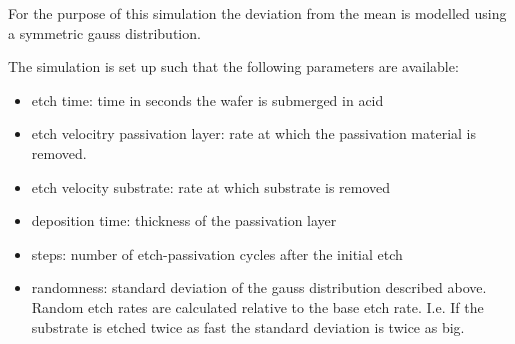 For the purpose of this simulation the deviation from the mean is modelled using a symmetric gauss distribution.

The simulation is set up such that the following parameters are available:
\begin{itemize}
    \item etch time: time in seconds the wafer is submerged in acid
    \item etch velocitry passivation layer: rate at which the passivation material is removed.
    \item etch velocity substrate: rate at which substrate is removed
    \item deposition time: thickness of the passivation layer
    \item steps: number of etch-passivation cycles after the initial etch
    \item randomness: standard deviation of the gauss distribution described above. Random etch rates are calculated relative to the base etch rate. I.e. If the substrate is etched twice as fast the standard deviation is twice as big.
\end{itemize}

